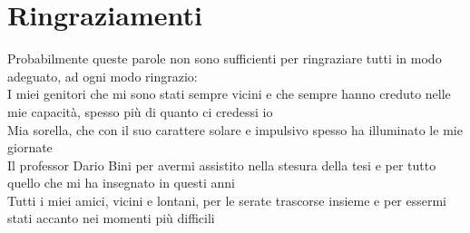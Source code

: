 
\chapter*{Ringraziamenti}

Probabilmente queste parole non sono sufficienti per ringraziare tutti in modo adeguato, ad ogni modo ringrazio: \\[0.5cm]

I miei genitori che mi sono stati sempre vicini e che sempre hanno creduto nelle mie capacità, 
spesso più di quanto ci credessi io
\\[0.1cm]

Mia sorella, che con il suo carattere solare e impulsivo spesso ha illuminato le mie giornate
\\[0.1cm]

Il professor Dario Bini per avermi assistito nella stesura della tesi e per tutto quello che mi ha insegnato in questi anni
\\[0.1cm]

Tutti i miei amici, vicini e lontani, per le serate trascorse insieme e per essermi stati accanto nei momenti più difficili


